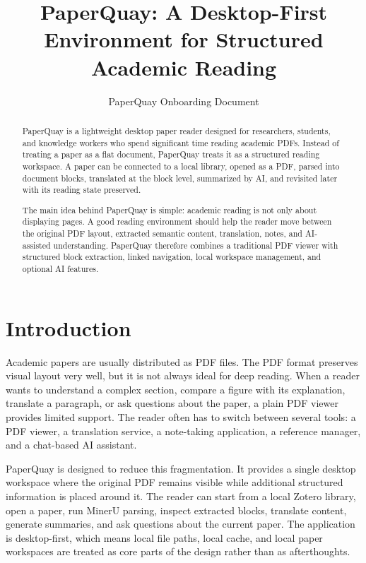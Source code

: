 ﻿\documentclass[11pt,a4paper]{article}
\title{\textbf{PaperQuay: A Desktop-First Environment for Structured Academic Reading}}
\author{PaperQuay Onboarding Document}
\date{}
\begin{document}
\maketitle

\begin{abstract}
PaperQuay is a lightweight desktop paper reader designed for researchers, students, and knowledge workers who spend significant time reading academic PDFs. Instead of treating a paper as a flat document, PaperQuay treats it as a structured reading workspace. A paper can be connected to a local library, opened as a PDF, parsed into document blocks, translated at the block level, summarized by AI, and revisited later with its reading state preserved.

The main idea behind PaperQuay is simple: academic reading is not only about displaying pages. A good reading environment should help the reader move between the original PDF layout, extracted semantic content, translation, notes, and AI-assisted understanding. PaperQuay therefore combines a traditional PDF viewer with structured block extraction, linked navigation, local workspace management, and optional AI features.
\end{abstract}

\section{Introduction}

Academic papers are usually distributed as PDF files. The PDF format preserves visual layout very well, but it is not always ideal for deep reading. When a reader wants to understand a complex section, compare a figure with its explanation, translate a paragraph, or ask questions about the paper, a plain PDF viewer provides limited support. The reader often has to switch between several tools: a PDF viewer, a translation service, a note-taking application, a reference manager, and a chat-based AI assistant.

PaperQuay is designed to reduce this fragmentation. It provides a single desktop workspace where the original PDF remains visible while additional structured information is placed around it. The reader can start from a local Zotero library, open a paper, run MinerU parsing, inspect extracted blocks, translate content, generate summaries, and ask questions about the current paper. The application is desktop-first, which means local file paths, local cache, and local paper workspaces are treated as core parts of the design rather than as afterthoughts.
\end{document}
